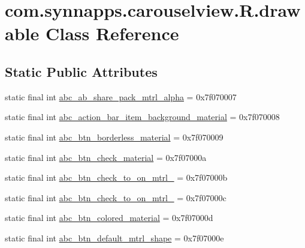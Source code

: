\hypertarget{classcom_1_1synnapps_1_1carouselview_1_1_r_1_1drawable}{}\section{com.\+synnapps.\+carouselview.\+R.\+drawable Class Reference}
\label{classcom_1_1synnapps_1_1carouselview_1_1_r_1_1drawable}
\subsection*{Static Public Attributes}
\begin{DoxyCompactItemize}
\item 
static final int \mbox{\hyperlink{classcom_1_1synnapps_1_1carouselview_1_1_r_1_1drawable_a14acbd3e8cc264687ca05c8a84b34702}{abc\+\_\+ab\+\_\+share\+\_\+pack\+\_\+mtrl\+\_\+alpha}} = 0x7f070007
\item 
static final int \mbox{\hyperlink{classcom_1_1synnapps_1_1carouselview_1_1_r_1_1drawable_ad56536d53da8e496702b53c443ad72b2}{abc\+\_\+action\+\_\+bar\+\_\+item\+\_\+background\+\_\+material}} = 0x7f070008
\item 
static final int \mbox{\hyperlink{classcom_1_1synnapps_1_1carouselview_1_1_r_1_1drawable_aedc2f442fcbc837176a1061d33e76117}{abc\+\_\+btn\+\_\+borderless\+\_\+material}} = 0x7f070009
\item 
static final int \mbox{\hyperlink{classcom_1_1synnapps_1_1carouselview_1_1_r_1_1drawable_a0c78e600aba970414f78f82e372e2f8a}{abc\+\_\+btn\+\_\+check\+\_\+material}} = 0x7f07000a
\item 
static final int \mbox{\hyperlink{classcom_1_1synnapps_1_1carouselview_1_1_r_1_1drawable_ad8928808e3e266c767a82329670ab226}{abc\+\_\+btn\+\_\+check\+\_\+to\+\_\+on\+\_\+mtrl\+\_}} = 0x7f07000b
\item 
static final int \mbox{\hyperlink{classcom_1_1synnapps_1_1carouselview_1_1_r_1_1drawable_a10d83e66545f71f02393cc87c4f874d0}{abc\+\_\+btn\+\_\+check\+\_\+to\+\_\+on\+\_\+mtrl\+\_}} = 0x7f07000c
\item 
static final int \mbox{\hyperlink{classcom_1_1synnapps_1_1carouselview_1_1_r_1_1drawable_a34ef69734c888e530d89411b7486a7e9}{abc\+\_\+btn\+\_\+colored\+\_\+material}} = 0x7f07000d
\item 
static final int \mbox{\hyperlink{classcom_1_1synnapps_1_1carouselview_1_1_r_1_1drawable_a9372c0fa558484beae7e3a8141ebf3ce}{abc\+\_\+btn\+\_\+default\+\_\+mtrl\+\_\+shape}} = 0x7f07000e

\end{DoxyCompactItemize}
